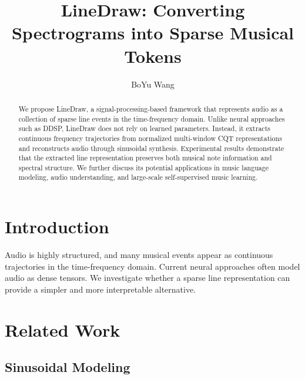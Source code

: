 \documentclass[11pt]{article}
\title{LineDraw:
Converting Spectrograms into Sparse Musical Tokens}
\author{BoYu Wang}
\date{}
\begin{document}
\maketitle

\begin{abstract}
We propose LineDraw,
    a signal-processing-based framework
    that represents audio
    as a collection of sparse line events in the time-frequency domain.
Unlike neural approaches such as DDSP,
    LineDraw does not rely on learned parameters.
Instead, it extracts continuous frequency trajectories
    from normalized multi-window CQT representations and
    reconstructs audio through sinusoidal synthesis.
Experimental results demonstrate that
    the extracted line representation preserves both musical note information
    and spectral structure.
We further discuss its potential applications in music language modeling,
    audio understanding, and large-scale self-supervised music learning.

\end{abstract}

\section{Introduction}
Audio is highly structured,
    and many musical events appear as continuous trajectories
    in the time-frequency domain.
Current neural approaches often model audio as dense tensors.
We investigate whether a sparse line representation
    can provide a simpler and more interpretable alternative.

\section{Related Work}
\subsection{Sinusoidal Modeling}
\end{document}
